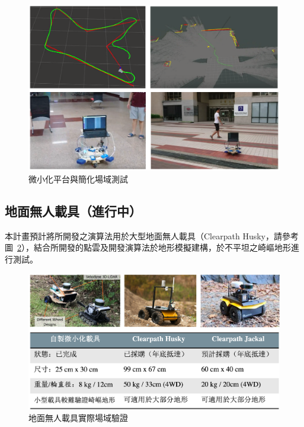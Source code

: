 \begin{figure}[h] %
\includegraphics[width=\columnwidth]{images/exp-results.png}
\centering
\caption{微小化平台與簡化場域測試}
 \label{figure:exp-results}
\end{figure}


\subsection{地面無人載具（進行中）}

本計畫預計將所開發之演算法用於大型地面無人載具（Clearpath Husky，請參考圖~\ref{figure:ground-vehicle}），結合所開發的點雲及開發演算法於地形模擬建構，於不平坦之崎嶇地形進行測試。

\begin{figure}[h] %
\includegraphics[width=\columnwidth]{images/ground-vehicle.png}
\centering
\caption{地面無人載具實際場域驗證}
 \label{figure:ground-vehicle}
\end{figure}

